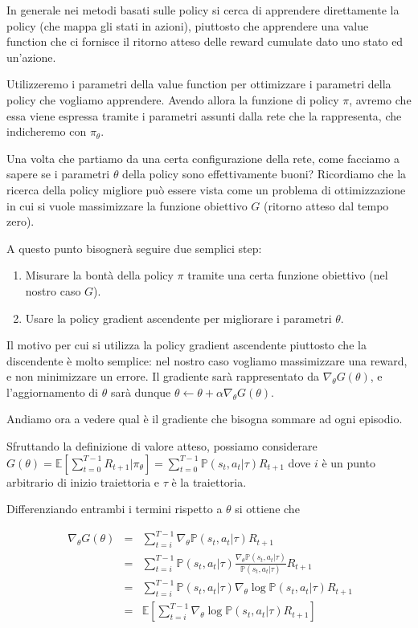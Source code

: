 \documentclass[a4paper,11pt,twoside]{report} %
\begin{document}
In generale nei metodi basati sulle policy si cerca di apprendere direttamente la policy (che mappa gli stati in azioni), piuttosto che apprendere una value function che ci fornisce il ritorno atteso delle reward cumulate dato uno stato ed un'azione.

Utilizzeremo i parametri della value function per ottimizzare i parametri della policy che vogliamo apprendere. Avendo allora la funzione di policy $\pi$, avremo che essa viene espressa tramite i parametri assunti dalla rete che la rappresenta, che indicheremo con $\pi_{\theta}$.

Una volta che partiamo da una certa configurazione della rete, come facciamo a sapere se i parametri $\theta$ della policy sono effettivamente buoni? Ricordiamo che la ricerca della policy migliore può essere vista come un problema di ottimizzazione in cui si vuole massimizzare la funzione obiettivo $G$ (ritorno atteso dal tempo zero).

A questo punto bisognerà seguire due semplici step:

\begin{enumerate}
	\item Misurare la bontà della policy $\pi$ tramite una certa funzione obiettivo (nel nostro caso $G$).
	\item Usare la policy gradient ascendente per migliorare i parametri $\theta$.
\end{enumerate}

Il motivo per cui si utilizza la policy gradient ascendente piuttosto che la discendente è molto semplice: nel nostro caso vogliamo massimizzare una reward, e non minimizzare un errore. Il gradiente sarà rappresentato da $\nabla_{\theta}G(\theta)$, e l'aggiornamento di $\theta$ sarà dunque $\theta \leftarrow \theta + \alpha \nabla_{\theta}G(\theta)$. 

Andiamo ora a vedere qual è il gradiente che bisogna sommare ad ogni episodio.

Sfruttando la definizione di valore atteso, possiamo considerare $G(\theta)=\mathbb{E}[\sum_{t=0}^{T-1}R_{t+1}|\pi_{\theta}]=\sum_{t=0}^{T-1}\mathbb{P}(s_{t},a_{t}|\tau)R_{t+1}$ dove $i$ è un punto arbitrario di inizio traiettoria e $\tau$ è la traiettoria.

Differenziando entrambi i termini rispetto a $\theta$ si ottiene che

\begin{eqnarray}
	\ \nabla_{\theta}G(\theta) & = & \sum_{t=i}^{T-1}\nabla_{\theta}\mathbb{P}(s_{t},a_{t}|\tau)R_{t+1} \nonumber \\
	&=& \sum_{t=i}^{T-1}\mathbb{P}(s_{t},a_{t}|\tau)\frac{\nabla_{\theta}\mathbb{P}(s_{t},a_{t}|\tau)}{\mathbb{P}(s_{t},a_{t}|\tau)}R_{t+1} \nonumber \\
	& = & \sum_{t=i}^{T-1}\mathbb{P}(s_{t},a_{t}|\tau)\nabla_{\theta}\log \mathbb{P}(s_{t},a_{t}|\tau)R_{t+1} \nonumber \\
	&= & \mathbb{E}[\sum_{t=i}^{T-1}\nabla_{\theta}\log \mathbb{P}(s_{t},a_{t}|\tau)R_{t+1}]
\end{eqnarray}
\end{document}
